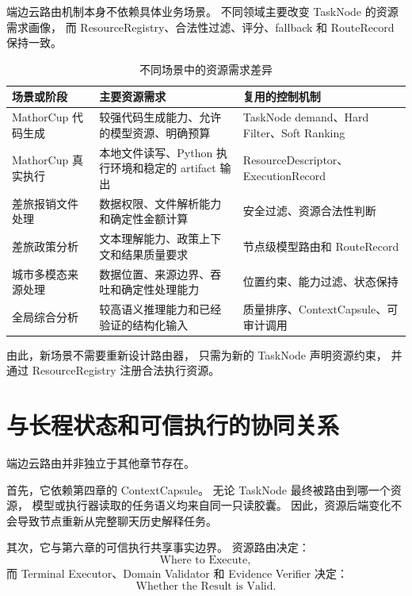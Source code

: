 \documentclass[UTF8,a4paper,12pt,oneside]{ctexbook}
\begin{document}
端边云路由机制本身不依赖具体业务场景。
不同领域主要改变 TaskNode 的资源需求画像，
而 ResourceRegistry、合法性过滤、评分、fallback 和 RouteRecord 保持一致。

\begin{table}[htbp]
\centering
\caption{不同场景中的资源需求差异}
\label{tab:cross-domain-resource-demand}
\begin{tabularx}{0.97\textwidth}{p{}X X}
\toprule
场景或阶段 & 主要资源需求 & 复用的控制机制\\
\midrule

MathorCup 代码生成
&
较强代码生成能力、允许的模型资源、明确预算
&
TaskNode demand、Hard Filter、Soft Ranking
\\

MathorCup 真实执行
&
本地文件读写、Python 执行环境和稳定的 artifact 输出
&
ResourceDescriptor、ExecutionRecord
\\

差旅报销文件处理
&
数据权限、文件解析能力和确定性金额计算
&
安全过滤、资源合法性判断
\\

差旅政策分析
&
文本理解能力、政策上下文和结果质量要求
&
节点级模型路由和 RouteRecord
\\

城市多模态来源处理
&
数据位置、来源边界、吞吐和确定性处理能力
&
位置约束、能力过滤、状态保持
\\

全局综合分析
&
较高语义推理能力和已经验证的结构化输入
&
质量排序、ContextCapsule、可审计调用
\\

\bottomrule
\end{tabularx}
\end{table}

由此，新场景不需要重新设计路由器，
只需为新的 TaskNode 声明资源约束，
并通过 ResourceRegistry 注册合法执行资源。


\section{与长程状态和可信执行的协同关系}

端边云路由并非独立于其他章节存在。

首先，它依赖第四章的 ContextCapsule。
无论 TaskNode 最终被路由到哪一个资源，
模型或执行器读取的任务语义均来自同一只读胶囊。
因此，资源后端变化不会导致节点重新从完整聊天历史解释任务。

其次，它与第六章的可信执行共享事实边界。
资源路由决定：
\[
\text{Where to Execute},
\]
而 Terminal Executor、Domain Validator 和 Evidence Verifier 决定：
\[
\text{Whether the Result is Valid}.
\]
\end{document}
